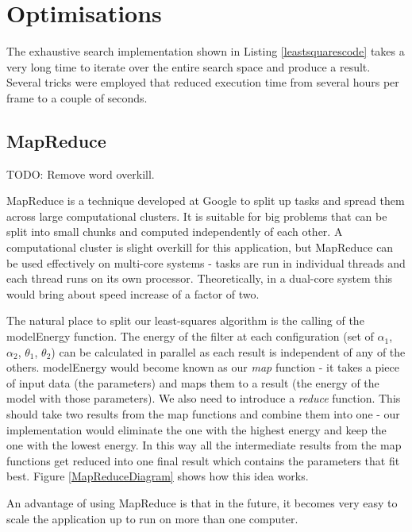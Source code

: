 \section{Optimisations}

The exhaustive search implementation shown in Listing \ref{leastsquarescode} takes a very long time to iterate over the entire search space and produce a result.
Several tricks were employed that reduced execution time from several hours per frame to a couple of seconds.

\subsection{MapReduce}

TODO: Remove word overkill.

MapReduce \cite{MapReduce} is a technique developed at Google to split up tasks and spread them across large computational clusters.
It is suitable for big problems that can be split into small chunks and computed independently of each other.
A computational cluster is slight overkill for this application, but MapReduce can be used effectively on multi-core systems - tasks are run in individual threads and each thread runs on its own processor.
Theoretically, in a dual-core system this would bring about speed increase of a factor of two.

The natural place to split our least-squares algorithm is the calling of the modelEnergy function.
The energy of the filter at each configuration (set of $\alpha_1$, $\alpha_2$, $\theta_1$, $\theta_2$) can be calculated in parallel as each result is independent of any of the others.
modelEnergy would become known as our \emph{map} function - it takes a piece of input data (the parameters) and maps them to a result (the energy of the model with those parameters).
We also need to introduce a \emph{reduce} function.
This should take two results from the map functions and combine them into one - our implementation would eliminate the one with the highest energy and keep the one with the lowest energy.
In this way all the intermediate results from the map functions get reduced into one final result which contains the parameters that fit best.
Figure \ref{MapReduceDiagram} shows how this idea works.

An advantage of using MapReduce is that in the future, it becomes very easy to scale the application up to run on more than one computer.

